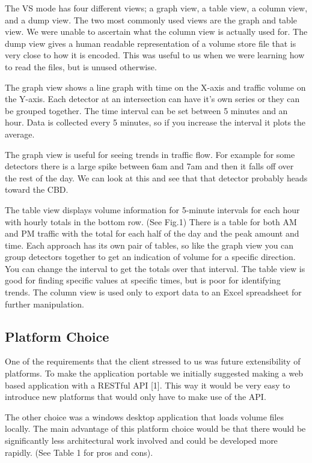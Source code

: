 \documentclass{article}
\begin{document}
The VS mode has four different views; a graph view, a
table view, a column view, and a dump view. The two most
commonly used views are the graph and table view. We were
unable to ascertain what the column view is actually used for.
The dump view gives a human readable representation of a
volume store file that is very close to how it is encoded. This
was useful to us when we were learning how to read the files,
but is unused otherwise.

The graph view shows a line graph with time on the X-axis
and traffic volume on the Y-axis. Each detector at an
intersection can have it’s own series or they can be grouped
together. The time interval can be set between 5 minutes and
an hour. Data is collected every 5 minutes, so if you increase
the interval it plots the average.

The graph view is useful for seeing trends in traffic flow.
For example for some detectors there is a large spike between
6am and 7am and then it falls off over the rest of the day. We
can look at this and see that that detector probably heads
toward the CBD.

The table view displays volume information for 5-minute
intervals for each hour with hourly totals in the bottom row.
(See Fig.1) There is a table for both AM and PM traffic with
the total for each half of the day and the peak amount and
time. Each approach has its own pair of tables, so like the
graph view you can group detectors together to get an
indication of volume for a specific direction. You can change
the interval to get the totals over that interval.
The table view is good for finding specific values at
specific times, but is poor for identifying trends.
The column view is used only to export data to an Excel
spreadsheet for further manipulation.

\subsection{Platform Choice}
One of the requirements that the client stressed to us was
future extensibility of platforms. To make the application
portable we initially suggested making a web based
application with a RESTful API [1]. This way it would be
very easy to introduce new platforms that would only have to
make use of the API.

The other choice was a windows desktop application that
loads volume files locally. The main advantage of this
platform choice would be that there would be significantly less
architectural work involved and could be developed more
rapidly. (See Table 1 for pros and cons).
\end{document}
